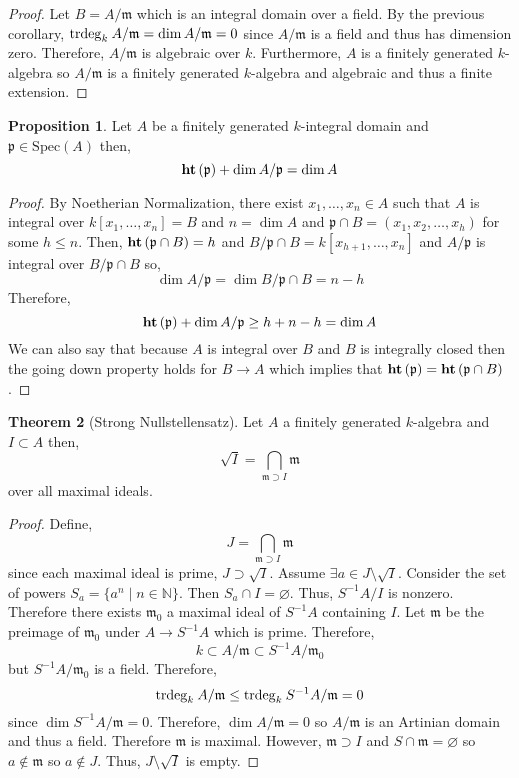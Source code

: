 \documentclass[12pt]{article}
\newcommand{\N}{\mathbb{N}}
\newcommand{\Spec}[1]{\mathrm{Spec}\left( #1 \right)}
\newcommand{\p}{\mathfrak{p}}
\newcommand{\m}{\mathfrak{m}}
\theoremstyle{remark}
\theoremstyle{definition}
\newtheorem{theorem}{Theorem}[section]
\newtheorem{proposition}[theorem]{Proposition}
\begin{document}
\begin{proof}
Let $B = A / \m$ which is an integral domain over a field. By the previous corollary, $\trdeg{k}{A/\m} = \dim{A / \m} = 0$ since $A / \m$ is a field and thus has dimension zero. Therefore, $A / \m$ is algebraic over $k$. Furthermore, $A$ is a finitely generated $k$-algebra so $A / \m$ is a finitely generated $k$-algebra and algebraic and thus a finite extension. 
\end{proof}

\begin{proposition}
Let $A$ be a finitely generated $k$-integral domain and $\p \in \Spec{A}$ then,
\[ \height{\p} + \dim{A / \p} = \dim{A} \]
\end{proposition}

\begin{proof}
By Noetherian Normalization, there exist $x_1, \dots, x_n \in A$ such that $A$ is integral over $k[x_1, \dots, x_n] = B$ and $n = \dim{A}$ and $\p \cap B = (x_1, x_2, \dots, x_h)$ for some $h \le n$. Then, $\height{\p \cap B} = h$ and $B / \p \cap B = k[x_{h+1}, \dots, x_n]$ and $A / \p$ is integral over $B / \p \cap B$ so,
\[ \dim{A / \p} = \dim{B / \p \cap B} = n - h \]
Therefore,
\[ \height{\p} + \dim{A / \p} \ge h + n - h = \dim{A} \]
We can also say that because $A$ is integral over $B$ and $B$ is integrally closed then the going down property holds for $B \to A$ which implies that $\height{\p} = \height{\p \cap B}$. 
\end{proof}

\begin{theorem}[Strong Nullstellensatz]
Let $A$ a finitely generated $k$-algebra and $I \subset A$ then,
\[ \sqrt{I} = \bigcap_{\m \supset I} \m \]
over all maximal ideals.
\end{theorem}

\begin{proof}
Define,
\[ J = \bigcap_{\m \supset I} \m\]
since each maximal ideal is prime, $J \supset \sqrt{I}$. Assume $\exists a \in J \setminus \sqrt{I}$. Consider the set of powers $S_a = \{a^n \mid n \in \N \}$. Then $S_a \cap I = \varnothing$. Thus, $S^{-1} A / I$ is nonzero. Therefore there exists $\m_0$ a maximal ideal of $S^{-1} A$ containing $I$. Let $\m$ be the preimage of $\m_0$ under $A \to S^{-1} A$ which is prime. Therefore,
\[ k \subset A / \m \subset S^{-1} A / \m_0 \]
but $S^{-1} A / \m_0$ is a field. Therefore,
\[ \trdeg{k}{A / \m} \le \trdeg{k}{S^{-1} A / \m} = 0 \]
since $\dim{S^{-1} A / \m} = 0$. Therefore, $\dim{A / \m} = 0$ so $A / \m$ is an Artinian domain and thus a field. Therefore $\m$ is maximal. However, $\m \supset I$ and $S \cap \m = \varnothing$ so $a \notin \m$ so $a \notin J$. Thus, $J \setminus \sqrt{I}$ is empty. 
\end{proof}
\end{document}
